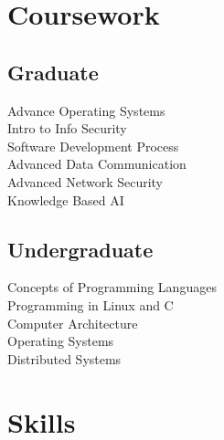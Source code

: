 \documentclass[]{deedy-resume-openfont}
\begin{document}
\begin{minipage}[t]{0.33\textwidth}

\section{Coursework}
\subsection{Graduate}
Advance Operating Systems \\
Intro to Info Security \\
Software Development Process \\
Advanced Data Communication \\
Advanced Network Security \\
Knowledge Based AI
\sectionsep
\subsection{Undergraduate}
Concepts of Programming Languages \\
Programming in Linux and C \\
Computer Architecture \\
Operating Systems \\
Distributed Systems
\sectionsep


\section{Skills}

\end{minipage}
\end{document}

